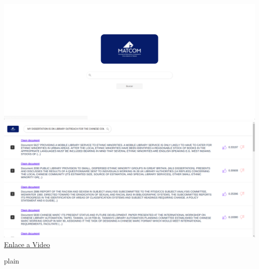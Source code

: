 \documentclass{llncs}
\begin{document}
\begin{center}
	\includegraphics[scale=0.18]{../image-2.png}\\
	\includegraphics[scale=0.2]{../image-1.png}\\
	
	\href{https://www.loom.com/share/6d941e0b0c7c4f3dafd77a9e0d6cf4fa}{Enlace a Video}
\end{center}


\nocite{silva2021,sri_conf}
 {plain}

\end{document}
